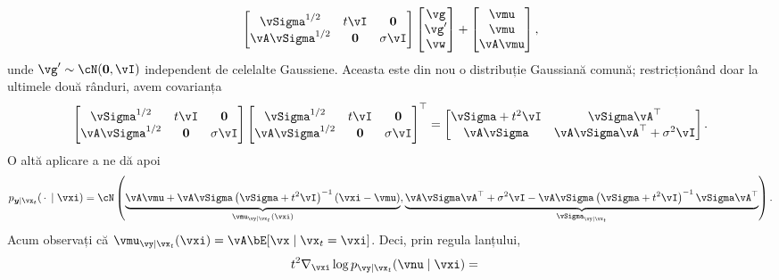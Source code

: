 \documentclass[../../book-main_ro.tex]{subfiles}
\begin{document}
\begin{example}
\begin{equation}
\begin{bmatrix}
      \vSigma^{1/2} & t\vI & \Zero \\
      \vA \vSigma^{1/2} & \Zero & \sigma \vI
    \end{bmatrix}
    \begin{bmatrix}
      \vg \\
      \vg' \\
      \vw
    \end{bmatrix}
    +
    \begin{bmatrix}
      \vmu \\
      \vmu \\
      \vA\vmu
    \end{bmatrix},
  \end{equation}
  unde $\vg' \sim \cN(\Zero, \vI)$ independent de celelalte Gaussiene.
  Aceasta este din nou o distribuție Gaussiană comună; restricționând doar la ultimele
  două rânduri, avem covarianța
  \begin{equation*}
    \begin{bmatrix}
      \vSigma^{1/2} & t\vI & \Zero \\
      \vA \vSigma^{1/2} & \Zero & \sigma \vI
    \end{bmatrix}
    \begin{bmatrix}
      \vSigma^{1/2} & t\vI & \Zero \\
      \vA \vSigma^{1/2} & \Zero & \sigma \vI
    \end{bmatrix}^\top
    =
    \begin{bmatrix}
      \vSigma + t^2\vI & \vSigma\vA^\top \\
      \vA\vSigma & \vA\vSigma\vA^\top + \sigma^2 \vI
    \end{bmatrix}.
  \end{equation*}
  O altă aplicare a  ne dă apoi
  \begin{equation}
    p_{\y \mid \vx_t}(\spcdot \mid \vxi) = \cN\left(
    \underbrace{%
      \vA\vmu + \vA\vSigma\left( \vSigma + t^2 \vI \right)^{-1}
      \left(
        \vxi - \vmu
      \right)
      }_{\vmu_{\vy \mid \vx_t}(\vxi)},
      \underbrace{%
        \vA\vSigma\vA^\top + \sigma^2 \vI - \vA\vSigma \left( \vSigma
        + t^2 \vI\right)^{-1} \vSigma \vA^\top
      }_{\vSigma_{\vy\mid \vx_t}}
    \right).
  \end{equation}
  Acum observați că $\vmu_{\vy \mid \vx_t}(\vxi) = \vA \bE[\vx \mid \vx_t=\vxi]$.
  Deci, prin regula lanțului,
  \begin{align*}
    t^2 \nabla_{\vxi} \log p_{\vy \mid \vx_t}(\vnu \mid \vxi)
    &=

\end{align*}
\end{example}
\end{document}
